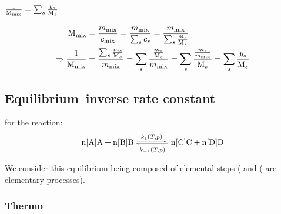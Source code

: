 \subsection{$\frac{1}{\Mm_\text{mix}} = \sum_s \frac{y_s}{\Mm_s}$}
\label{demo-Mm}
\[
\begin{split}
\Mm_\text{mix} & = \frac{m_\text{mix}}{c_\text{mix}}
                 = \frac{m_\text{mix}}{\sum_s c_s}
                 = \frac{m_\text{mix}}{\sum_s \frac{m_s}{\Mm_s}}\\
\Rightarrow
\frac{1}{\Mm_\text{mix}}
               & = \frac{\sum_s\frac{m_s}{\Mm_s}}{m_\text{mix}}
                 = \sum_s\frac{\frac{m_s}{\Mm_s}}{m_\text{mix}}
                 = \sum_s\frac{\frac{m_s}{m_\text{mix}}}{\Mm_s}
                 = \sum_s\frac{y_s}{\Mm_s}
\end{split}
\]

\subsection{Equilibrium--inverse rate constant}

for the reaction:
\begin{equation}
\ce{\scoefabs[A] A + \scoefabs[B] B <=>[k_1(T,p)][k_{-1}(T,p)] \scoefabs[C] C + \scoefabs[D] D}
\label{eq:equat}
\end{equation}

We consider this equilibrium being composed of elemental steps
(%
 and
(
are elementary processes). 

\subsubsection{Thermo}
\label{demo-eq}

